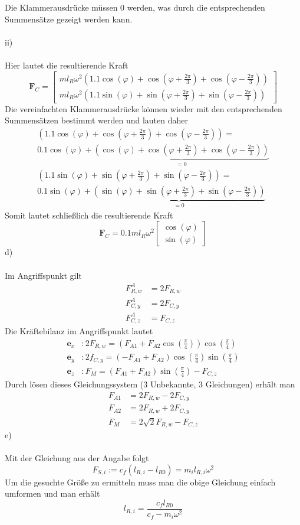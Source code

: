 Die Klammerausdrücke müssen 0 werden, was durch die entsprechenden Summensätze gezeigt werden kann.\\ \\
ii)\\ \\
Hier lautet die resultierende Kraft
\[
	\textbf{F}_C = \begin{bmatrix}
	ml_R\omega^2\left(1.1\cos(\varphi) + \cos(\varphi + \frac{2\pi}{3}) + \cos(\varphi - \frac{2\pi}{3})\right) \\
	ml_R\omega^2\left(1.1\sin(\varphi) + \sin(\varphi + \frac{2\pi}{3}) + \sin(\varphi - \frac{2\pi}{3})\right)
	\end{bmatrix}
\]
Die vereinfachten Klammerausdrücke können wieder mit den entsprechenden Summensätzen bestimmt werden und lauten daher
\begin{align*}
\left(1.1\cos(\varphi) + \cos(\varphi + \frac{2\pi}{3}) + \cos(\varphi - \frac{2\pi}{3})\right) = \\
0.1\cos(\varphi) + \underbrace{\left(\cos(\varphi) + \cos(\varphi + \frac{2\pi}{3}) + \cos(\varphi - \frac{2\pi}{3})\right)}_{=0} \\
\left(1.1\sin(\varphi) + \sin(\varphi + \frac{2\pi}{3}) + \sin(\varphi - \frac{2\pi}{3})\right) = \\
0.1\sin(\varphi) + \underbrace{\left(\sin(\varphi) + \sin(\varphi + \frac{2\pi}{3}) + \sin(\varphi - \frac{2\pi}{3})\right)}_{=0}
\end{align*}
Somit lautet schließlich die resultierende Kraft
\[
	\textbf{F}_C = 0.1ml_R\omega^2\begin{bmatrix}
		\cos(\varphi) \\
		\sin(\varphi)
	\end{bmatrix}
\]
d)\\ \\
Im Angriffspunkt gilt
\begin{align*}
	F_{R,w}^A &= 2F_{R,w} \\
	F_{C,y}^A &= 2F_{C,y} \\
	F_{C,z}^A &= F_{C,z}
\end{align*}
Die Kräftebilanz im Angriffspunkt lautet
\begin{align*}
	\textbf{e}_x &: 2F_{R,w} = (F_{A1} + F_{A2}\cos(\frac{\pi}{4}))\cos(\frac{\pi}{4}) \\
	\textbf{e}_y &: 2f_{C,y} = (-F_{A1} + F_{A2})\cos(\frac{\pi}{4})\sin(\frac{\pi}{4})\\
	\textbf{e}_z &: F_M = (F_{A1} + F_{A2})\sin(\frac{\pi}{4}) - F_{C,z}
\end{align*}
Durch lösen dieses Gleichungssystem (3 Unbekannte, 3 Gleichungen) erhält man
\begin{align*}
	F_{A1} &= 2F_{R,w} - 2F_{C,y} \\
	F_{A2} &= 2F_{R,w} + 2F_{C,y} \\
	F_M &= 2\sqrt{2}F_{R,w} - F_{C,z}
\end{align*}
e)\\ \\
Mit der Gleichung aus der Angabe folgt
\[
	F_{S,i} := c_f(l_{R,i} - l_{R0}) = m_il_{R,i}\omega^2
\]
Um die gesuchte Größe zu ermitteln muss man die obige Gleichung einfach umformen und man erhält
\[
	l_{R,i} = \frac{c_fl_{R0}}{c_f - m_i\omega^2}
\]